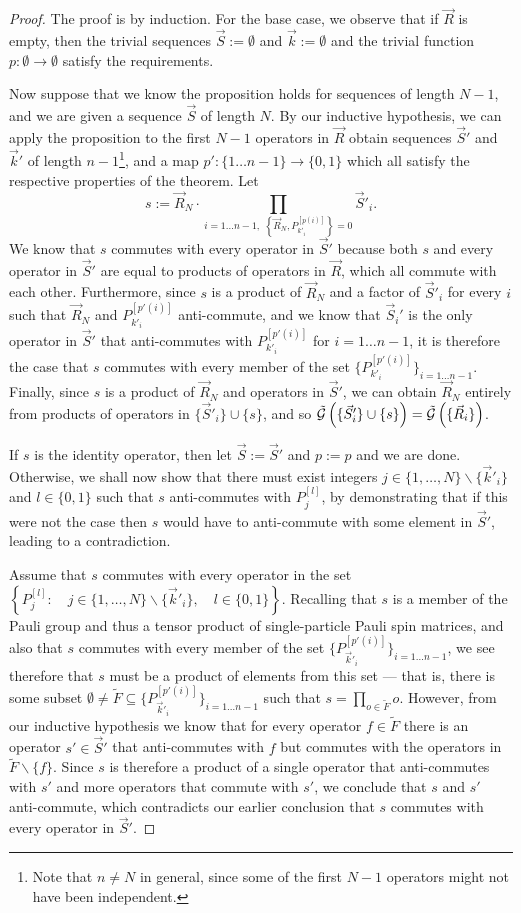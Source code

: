 \documentclass[twocolumn,showpacs,preprintnumbers,amsmath,amssymb,nofootinbib,pra,floatfix]{revtex4-1}
\newcommand{\lst}{\vec}
\newcommand{\set}{\tilde}
\newcommand{\genfun}{\tilde{\mathcal{G}}}
\begin{document}
\begin{proof}
The proof is by induction.  For the base case, we observe that if $\lst R$ is empty, then the trivial sequences $\lst S:=\emptyset$ and $\lst k :=\emptyset$ and the trivial function $p:\emptyset\to\emptyset$ satisfy the requirements.

Now suppose that we know the proposition holds for sequences of length $N-1$, and we are given a sequence $\lst S$ of length $N$.  By our inductive hypothesis, we can apply the proposition to the first $N-1$ operators in $\lst R$ obtain sequences $\lst S'$ and $\lst k'$ of length $n-1$\footnote{Note that $n\ne N$ in general, since some of the first $N-1$ operators might not have been independent.}, and a map $p':\{1\dots n-1\}\to \{0,1\}$ which all satisfy the respective properties of the theorem.  Let $$s:=\lst R_N\cdot \prod_{i=1\dots n-1, \,\,\left\{\lst R_N,P_{k'_i}^{[p(i)]}\right\}=0} \lst S'_i.$$  We know that $s$ commutes with every operator in $\lst S'$ because both $s$ and every operator in $\lst S'$ are equal to products of operators in $\lst R$, which all commute with each other.  Furthermore, since $s$ is a product of $\lst R_N$ and a factor of $\lst S'_i$ for every $i$ such that $\lst R_N$ and $P_{k'_i}^{[p'(i)]}$ anti-commute, and we know that $\lst S_i'$ is the only operator in $\lst S'$ that anti-commutes with $P_{k'_i}^{[p'(i)]}$ for $i=1\dots n-1$, it is therefore the case that $s$ commutes with every member of the set $\{P_{k'_i}^{[p'(i)]}\}_{i=1\dots n-1}$.  Finally, since $s$ is a product of $\lst R_N$ and operators in $\lst S'$, we can obtain $\lst R_N$ entirely from products of operators in $\{\lst S'_i\} \cup \{s\}$, and so $\genfun\paren{\{\lst S'_i\} \cup \{s\}}=\genfun\paren{\{\lst R_i\}}$.

If $s$ is the identity operator, then let $\lst S:=\lst S'$ and $p:=p$ and we are done.  Otherwise, we shall now show that there must exist integers $j\in\{1,\dots,N\}\backslash\{\lst k'_i\}$ and $l\in\{0,1\}$ such that $s$ anti-commutes with $P_{j}^{[l]}$, by demonstrating that if this were not the case then $s$ would have to anti-commute with some element in $\lst S'$, leading to a contradiction.

Assume that $s$ commutes with every operator in the set $\left\{P_j^{[l]}:\quad j\in\{1,\dots,N\}\backslash\{\lst k'_i\}, \quad l\in\{0,1\}\right\}.$  Recalling that $s$ is a member of the Pauli group and thus a tensor product of single-particle Pauli spin matrices, and also that $s$ commutes with every member of the set $\{P_{\lst k'_i}^{[p'(i)]}\}_{i=1\dots n-1}$, we see therefore that $s$ must be a product of elements from this set --- that is, there is some subset $\emptyset \ne \set F \subseteq \{P_{\lst k'_i}^{[p'(i)]}\}_{i=1\dots n-1}$ such that $s=\prod_{o\in \set F} o$.  However, from our inductive hypothesis we know that for every operator $f\in\set F$ there is an operator $s'\in\lst S'$ that anti-commutes with $f$ but commutes with the operators in $\set F\backslash\{f\}$.  Since $s$ is therefore a product of a single operator that anti-commutes with $s'$ and more operators that commute with $s'$, we conclude that $s$ and $s'$ anti-commute, which contradicts our earlier conclusion that $s$ commutes with every operator in $\lst S'$.


\end{proof}
\end{document}
